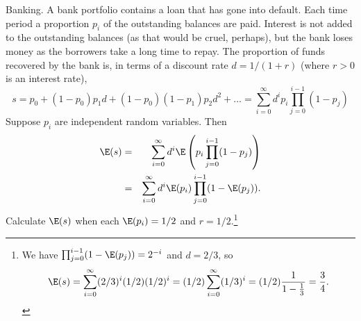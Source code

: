 \begin{example}{Banking.}
A bank portfolio contains a loan that has gone into default.
Each time period a proportion $p_i$ of the outstanding balances are paid.
Interest is not added to the outstanding balances (as that would be cruel, perhaps), but the bank loses money as the borrowers take a long time to repay.
The proportion of funds recovered by the bank is, in terms of a discount rate $d=1/(1+r)$ (where $r>0$ is an interest rate),
\[
	s = p_0 + (1-p_0)p_1d + (1-p_0)(1-p_1)p_2d^2+\dots = \sum_{i=0}^\infty d^i p_i\prod_{j=0}^{i-1} (1-p_j)
\]
Suppose $p_i$ are independent random variables. Then
\begin{eqnarray*}
	\E(s)&=&\sum_{i=0}^\infty d^i \E\left(p_i\prod_{j=0}^{i-1} (1-p_j)\right)\\
	&=& \sum_{i=0}^\infty d^i \E(p_i)\prod_{j=0}^{i-1} (1-\E(p_j)).
\end{eqnarray*}
Calculate $\E(s)$ when each $\E(p_i)=1/2$ and $r=1/2$.\footnote{We have $\prod_{j=0}^{i-1}(1-\E(p_j))=2^{-i}$ and $d=2/3$, so
\[
	\E(s)=\sum_{i=0}^\infty (2/3)^i (1/2)(1/2)^i = (1/2)\sum_{i=0}^\infty (1/3)^i = (1/2)\frac1{1-\frac13} = \frac34.
\]
}
\end{example}

